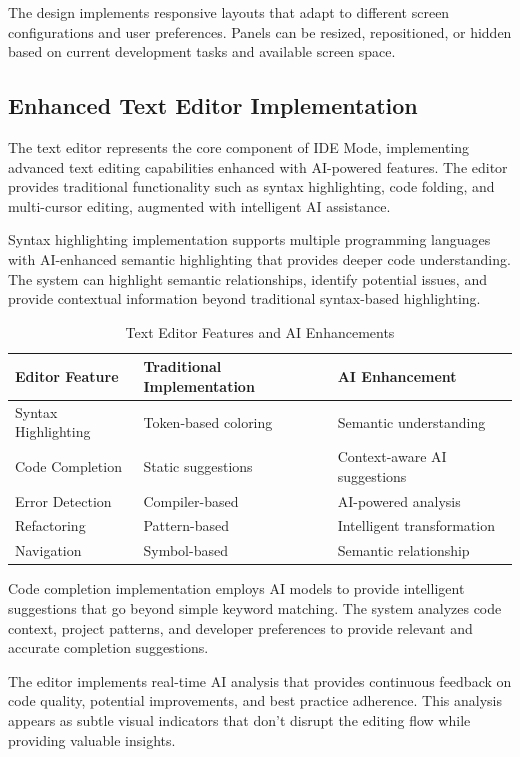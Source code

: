 The design implements responsive layouts that adapt to different screen configurations and user preferences. Panels can be resized, repositioned, or hidden based on current development tasks and available screen space.

\subsection*{Enhanced Text Editor Implementation}

The text editor represents the core component of IDE Mode, implementing advanced text editing capabilities enhanced with AI-powered features. The editor provides traditional functionality such as syntax highlighting, code folding, and multi-cursor editing, augmented with intelligent AI assistance.

Syntax highlighting implementation supports multiple programming languages with AI-enhanced semantic highlighting that provides deeper code understanding. The system can highlight semantic relationships, identify potential issues, and provide contextual information beyond traditional syntax-based highlighting.

\begin{table}[ht]
\centering
\begin{tabular}{@{}lll@{}}
\toprule
\textbf{Editor Feature} & \textbf{Traditional Implementation} & \textbf{AI Enhancement} \\
\midrule
Syntax Highlighting & Token-based coloring & Semantic understanding \\
Code Completion & Static suggestions & Context-aware AI suggestions \\
Error Detection & Compiler-based & AI-powered analysis \\
Refactoring & Pattern-based & Intelligent transformation \\
Navigation & Symbol-based & Semantic relationship \\
\bottomrule
\end{tabular}
\caption{Text Editor Features and AI Enhancements}
\end{table}

Code completion implementation employs AI models to provide intelligent suggestions that go beyond simple keyword matching. The system analyzes code context, project patterns, and developer preferences to provide relevant and accurate completion suggestions.

The editor implements real-time AI analysis that provides continuous feedback on code quality, potential improvements, and best practice adherence. This analysis appears as subtle visual indicators that don't disrupt the editing flow while providing valuable insights.

